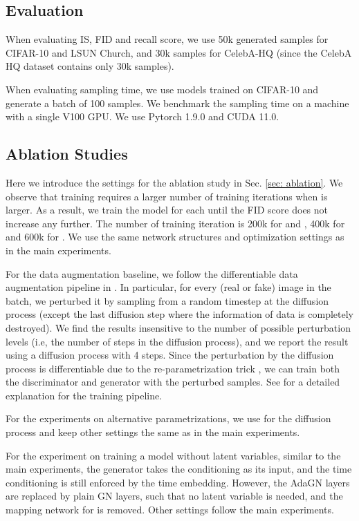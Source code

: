 \subsection{Evaluation}
When evaluating IS, FID and recall score, we use 50k generated samples for CIFAR-10 and LSUN Church, and 30k samples for CelebA-HQ (since the CelebA HQ dataset contains only 30k samples). 

When evaluating sampling time, we use models trained on CIFAR-10 and generate a batch of 100 samples. We benchmark the sampling time on a machine with a single V100 GPU. We use Pytorch 1.9.0 and CUDA 11.0. 

\subsection{Ablation Studies}
Here we introduce the settings for the ablation study in Sec. \ref{sec: ablation}. We observe that training requires a larger number of training iterations when  is larger. As a result, we train the model for each  until the FID score does not increase any further. The number of training iteration is 200k for  and , 400k for  and 600k for . We use the same network structures and optimization settings as in the main experiments.

For the data augmentation baseline, we follow the differentiable data augmentation pipeline in \citet{zhao2020differentiable}. In particular, for every (real or fake) image in the batch, we perturbed it by sampling from a random timestep at the diffusion process (except the last diffusion step where the information of data is completely destroyed). We find the results insensitive to the number of possible perturbation levels (i.e, the number of steps in the diffusion process), and we report the result using a diffusion process with 4 steps. Since the perturbation by the diffusion process is differentiable due to the re-parametrization trick \citep{kingma2014vae}, we can train both the discriminator and generator with the perturbed samples. See \citet{zhao2020differentiable} for a detailed explanation for the training pipeline.

For the experiments on alternative parametrizations, we use  for the diffusion process and keep other settings the same as in the main experiments.

For the experiment on training a model without latent variables, similar to the main experiments, the generator takes the conditioning  as its input, and the time conditioning is still enforced by the time embedding. However, the AdaGN layers are replaced by plain GN layers, such that no latent variable is needed, and the mapping network for  is removed. Other settings follow the main experiments.


